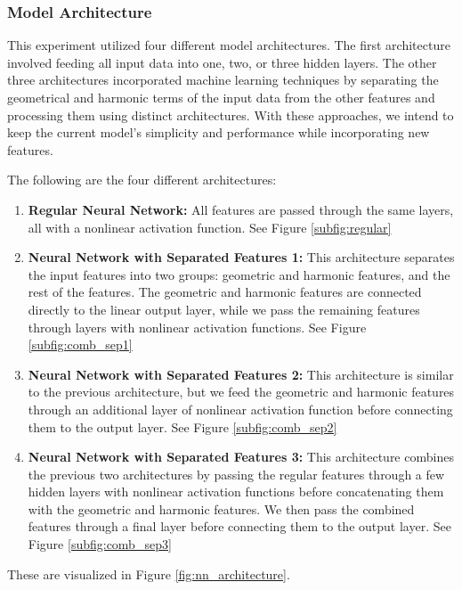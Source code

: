 \subsubsection{Model Architecture}
This experiment utilized four different model architectures.
The first architecture involved feeding all input data into one, two, or three hidden layers.
The other three architectures incorporated machine learning techniques by separating the geometrical and harmonic terms of the input data from the other features and processing them using distinct architectures.
With these approaches, we intend to keep the current model's simplicity and performance while incorporating new features.

The following are the four different architectures:
\begin{enumerate}
    \item \textbf{Regular Neural Network:} All features are passed through the same layers, all with a nonlinear activation function.
    See Figure \ref{subfig:regular}
    \item \textbf{Neural Network with Separated Features 1:} This architecture separates the input features into two groups: geometric and harmonic features, and the rest of the features.
    The geometric and harmonic features are connected directly to the linear output layer, while we pass the remaining features through layers with nonlinear activation functions.
    See Figure \ref{subfig:comb_sep1}
    \item \textbf{Neural Network with Separated Features 2:} This architecture is similar to the previous architecture,
    but we feed the geometric and harmonic features through an additional layer of nonlinear activation function before connecting them to the output layer.
    See Figure \ref{subfig:comb_sep2}
    \item \textbf{Neural Network with Separated Features 3:} This architecture combines the previous two architectures by passing the regular features through a few hidden layers with nonlinear activation functions before concatenating them with the geometric and harmonic features.
    We then pass the combined features through a final layer before connecting them to the output layer.
    See Figure \ref{subfig:comb_sep3}
\end{enumerate}
These are visualized in Figure \ref{fig:nn_architecture}.

